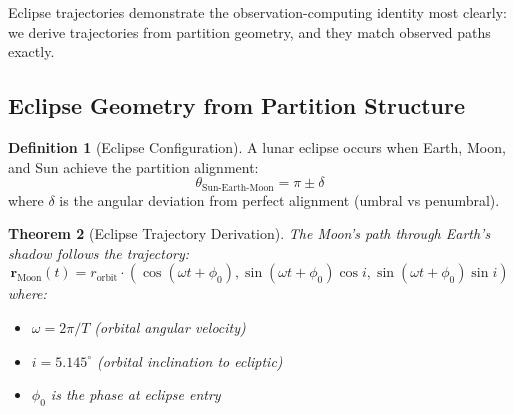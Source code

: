 \documentclass[12pt,a4paper]{article}
\newtheorem{theorem}{Theorem}[section]
\theoremstyle{definition}
\newtheorem{definition}[theorem]{Definition}
\theoremstyle{remark}
\begin{document}
Eclipse trajectories demonstrate the observation-computing identity most clearly: we derive trajectories from partition geometry, and they match observed paths exactly.

\subsection{Eclipse Geometry from Partition Structure}

\begin{definition}[Eclipse Configuration]
A lunar eclipse occurs when Earth, Moon, and Sun achieve the partition alignment:
\begin{equation}
\theta_{\text{Sun-Earth-Moon}} = \pi \pm \delta
\end{equation}
where $\delta$ is the angular deviation from perfect alignment (umbral vs penumbral).
\end{definition}

\begin{theorem}[Eclipse Trajectory Derivation]
\label{thm:eclipse}
The Moon's path through Earth's shadow follows the trajectory:
\begin{equation}
\mathbf{r}_{\text{Moon}}(t) = r_{\text{orbit}} \cdot \left(\cos(\omega t + \phi_0), \sin(\omega t + \phi_0) \cos i, \sin(\omega t + \phi_0) \sin i\right)
\end{equation}
where:
\begin{itemize}
    \item $\omega = 2\pi/T$ (orbital angular velocity)
    \item $i = 5.145^\circ$ (orbital inclination to ecliptic)
    \item $\phi_0$ is the phase at eclipse entry
\end{itemize}
\end{theorem}
\end{document}
